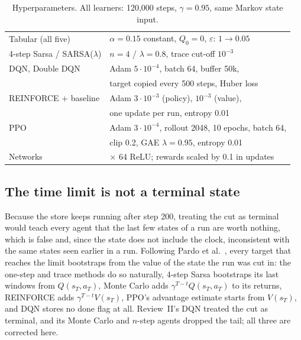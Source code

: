 \begin{table}[t]
\centering
\caption{Hyperparameters. All learners: 120{,}000 steps, $\gamma=0.95$, same Markov state input.}
\label{tab:hyper}
\footnotesize
\setlength{\tabcolsep}{4pt}
\begin{tabular}{@{}l>{\raggedright\arraybackslash}p{}@{}}
\toprule
Tabular (all five) & $\alpha=0.15$ constant, $Q_0=0$, $\varepsilon$: $1\to0.05$\\
4-step Sarsa / SARSA($\lambda$) & $n=4$ / $\lambda=0.8$, trace cut-off $10^{-3}$\\
DQN, Double DQN & Adam $5\cdot10^{-4}$, batch 64, buffer 50k,\\
& target copied every 500 steps, Huber loss\\
REINFORCE + baseline & Adam $3\cdot10^{-3}$ (policy), $10^{-3}$ (value),\\
& one update per run, entropy 0.01\\
PPO & Adam $3\cdot10^{-4}$, rollout 2048, 10 epochs, batch 64,\\
& clip 0.2, GAE $\lambda=0.95$, entropy 0.01\\
Networks & 2 $\times$ 64 ReLU; rewards scaled by 0.1 in updates\\
\bottomrule
\end{tabular}
\end{table}

\subsection{The time limit is not a terminal state}
Because the store keeps running after step 200, treating the cut as terminal would teach every agent that the last few states of a run are worth nothing, which is false and, since the state does not include the clock, inconsistent with the same states seen earlier in a run. Following Pardo et al.~\cite{pardo2018}, every target that reaches the limit bootstraps from the value of the state the run was cut in: the one-step and trace methods do so naturally, 4-step Sarsa bootstraps its last windows from $Q(s_T,a_T)$, Monte Carlo adds $\gamma^{T-t}Q(s_T,a_T)$ to its returns, REINFORCE adds $\gamma^{T-t}V(s_T)$, PPO's advantage estimate starts from $V(s_T)$, and DQN stores no done flag at all. Review~II's DQN treated the cut as terminal, and its Monte Carlo and $n$-step agents dropped the tail; all three are corrected here.


